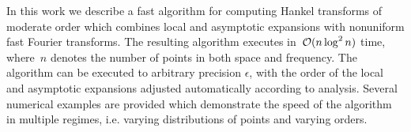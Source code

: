 In this work we describe a fast algorithm for computing Hankel transforms of
moderate order which combines local and asymptotic expansions with nonuniform
fast Fourier transforms. The resulting algorithm executes in~$\mathcal{O} (n \log^2 n)$
time, where~$n$ denotes the number of points in both space and frequency.  The
algorithm can be executed to arbitrary precision $\epsilon$, with the order of
the local and asymptotic expansions adjusted automatically according to
analysis. Several numerical examples are provided which demonstrate the speed of
the algorithm in multiple regimes, i.e. varying distributions of points and
varying orders.
